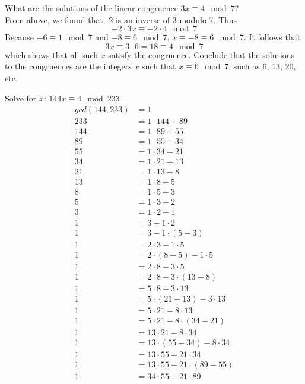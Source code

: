 \documentclass[12pt]{article}
\begin{document}
\begin{example} What are the solutions of the linear congruence $3x \equiv 4 \mod 7$? \\ From above, we found that -2 is an inverse of 3 modulo 7. Thus $$ -2 \cdot 3x \equiv -2 \cdot 4 \mod 7$$ Because $-6 \equiv 1 \mod 7$ and $-8 \equiv 6 \mod 7$, $x \equiv -8 \equiv 6 \mod 7$. It follows that $$3x \equiv 3 \cdot 6 = 18 \equiv 4 \mod 7$$ 
which shows that all such $x$ satisfy the congruence. Conclude that the solutions to the congruences are the integers $x$ such that $x \equiv 6 \mod 7$, such as 6, 13, 20, etc. \end{example} 
\begin{example} Solve for $x$: $144 x \equiv 4 \mod 233$
$$ \begin{aligned}
gcd(144, 233) &= 1 \\
233 & =1 \cdot 144 + 89 \\ 
144 &= 1 \cdot 89 + 55 \\ 
89 &= 1 \cdot 55 + 34 \\ 
55 &= 1 \cdot 34 + 21 \\ 
34 &= 1 \cdot 21 + 13 \\ 
21 &= 1 \cdot 13 + 8 \\
13 &= 1 \cdot 8 + 5 \\ 
8 &= 1 \cdot 5 + 3 \\ 
5 &= 1 \cdot 3 + 2 \\
3 &= 1 \cdot 2 + 1 \\ 
1 &= 3 - 1 \cdot 2 \\ 
1 &= 3 - 1 \cdot (5 - 3) \\
1 &= 2 \cdot 3 - 1 \cdot 5 \\
1 &= 2 \cdot (8 - 5) - 1 \cdot 5 \\
1 &= 2 \cdot 8 - 3 \cdot 5 \\
1 &= 2 \cdot 8 - 3 \cdot (13 - 8) \\
1 &= 5 \cdot 8 - 3 \cdot 13 \\
1 &= 5 \cdot (21 - 13) - 3 \cdot 13 \\ 
1 &= 5 \cdot 21 - 8 \cdot 13 \\
1 &= 5 \cdot 21 - 8 \cdot (34 - 21) \\ 
1 &= 13 \cdot 21 - 8 \cdot 34 \\ 
1 &= 13 \cdot (55 - 34) - 8 \cdot 34 \\ 
1 &= 13 \cdot 55 - 21 \cdot 34 \\ 
1 &= 13 \cdot 55 - 21 \cdot (89 - 55) \\ 
1 &= 34 \cdot 55 - 21 \cdot 89 \\

\end{aligned}$$
\end{example}
\end{document}
